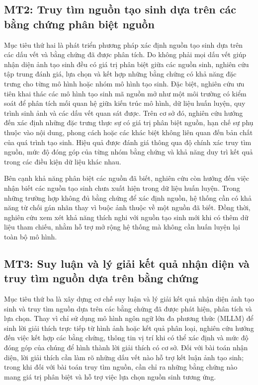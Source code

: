 \documentclass[12pt]{report}
\begin{document}
\subsection{MT2: Truy tìm nguồn tạo sinh dựa trên các bằng chứng phân biệt nguồn}
Mục tiêu thứ hai là phát triển phương pháp xác định nguồn tạo sinh dựa trên các dấu vết và bằng chứng đã được phân tích. Do không phải mọi dấu vết giúp nhận diện ảnh tạo sinh đều có giá trị phân biệt giữa các nguồn sinh, nghiên cứu tập trung đánh giá, lựa chọn và kết hợp những bằng chứng có khả năng đặc trưng cho từng mô hình hoặc nhóm mô hình tạo sinh. Đặc biệt, nghiên cứu ưu tiên khai thác các mô hình tạo sinh mã nguồn mở như một môi trường có kiểm soát để phân tích mối quan hệ giữa kiến trúc mô hình, dữ liệu huấn luyện, quy trình sinh ảnh và các dấu vết quan sát được. Trên cơ sở đó, nghiên cứu hướng đến xác định những đặc trưng thực sự có giá trị phân biệt nguồn, hạn chế sự phụ thuộc vào nội dung, phong cách hoặc các khác biệt không liên quan đến bản chất của quá trình tạo sinh. Hiệu quả được đánh giá thông qua độ chính xác truy tìm nguồn, mức độ đóng góp của từng nhóm bằng chứng và khả năng duy trì kết quả trong các điều kiện dữ liệu khác nhau.

Bên cạnh khả năng phân biệt các nguồn đã biết, nghiên cứu còn hướng đến việc nhận biết các nguồn tạo sinh chưa xuất hiện trong dữ liệu huấn luyện. Trong những trường hợp không đủ bằng chứng để xác định nguồn, hệ thống cần có khả năng từ chối gán nhãn thay vì buộc ảnh thuộc về một nguồn đã biết. Đồng thời, nghiên cứu xem xét khả năng thích nghi với nguồn tạo sinh mới khi có thêm dữ liệu tham chiếu, nhằm hỗ trợ mở rộng hệ thống mà không cần huấn luyện lại toàn bộ mô hình.

\subsection{MT3: Suy luận và lý giải kết quả nhận diện và truy tìm nguồn dựa trên bằng chứng}
Mục tiêu thứ ba là xây dựng cơ chế suy luận và lý giải kết quả nhận diện ảnh tạo sinh và truy tìm nguồn dựa trên các bằng chứng đã được phát hiện, phân tích và lựa chọn. Thay vì chỉ sử dụng mô hình ngôn ngữ lớn đa phương thức (MLLM) để sinh lời giải thích trực tiếp từ hình ảnh hoặc kết quả phân loại, nghiên cứu hướng đến việc kết hợp các bằng chứng, thông tin vị trí khi có thể xác định và mức độ đóng góp của chúng để hình thành lời giải thích có cơ sở. Đối với bài toán nhận diện, lời giải thích cần làm rõ những dấu vết nào hỗ trợ kết luận ảnh tạo sinh; trong khi đối với bài toán truy tìm nguồn, cần chỉ ra những bằng chứng nào mang giá trị phân biệt và hỗ trợ việc lựa chọn nguồn sinh tương ứng.
\end{document}
